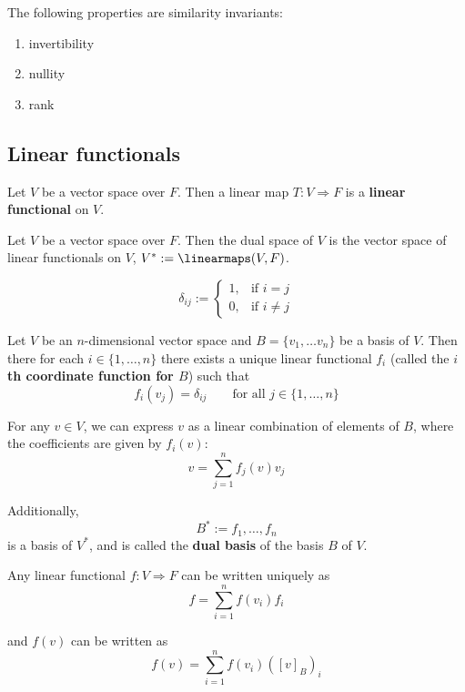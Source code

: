 \begin{theorem}
  The following properties are similarity invariants:
  \begin{enumerate}
    \item invertibility
    \item nullity
    \item rank
  \end{enumerate}
\end{theorem}

\subsection{Linear functionals}

\begin{definition}
  Let $V$ be a vector space over $F$. Then a linear map $T : V \Rightarrow F$ is a \textbf{linear functional} on $V$.
\end{definition}

\begin{definition}
  Let $V$ be a vector space over $F$. Then the dual space of $V$ is the vector space of linear functionals on $V$, $V^* := \linearmaps(V, F)$.
\end{definition}

\begin{definition}
  \[
    \delta_{ij} := \begin{cases}
      1, & \text{if $i = j$} \\
      0, & \text{if $i \neq j$}
    \end{cases}
  \]
\end{definition}

\begin{definition}
\end{definition}
\begin{definition}
\end{definition}
\begin{lemma}
  Let $V$ be an $n$-dimensional vector space and $B = \{v_1, \ldots v_n\}$ be a basis of $V$. Then there for each $i \in \{1, \ldots, n\}$ there exists a unique linear functional $f_i$ (called the \textbf{$i$th coordinate function for $B$}) such that
  \[
    f_i(v_j) = \delta_{ij} \qquad \text{for all $j \in \{1, \ldots, n\}$}
  \]

  For any $v \in V$, we can express $v$ as a linear combination of elements of $B$, where the coefficients are given by $f_i(v)$:
  \[
    v = \sum_{j = 1}^n f_j(v) v_j
  \]

  Additionally, 
  \[
    B^* := {f_1, \ldots, f_n}
  \]
  is a basis of $V^*$, and is called the \textbf{dual basis} of the basis $B$ of $V$.

  Any linear functional $f : V \Rightarrow F$ can be written uniquely as
  \[
    f = \sum_{i = 1}^n f(v_i) f_i
  \]

  and $f(v)$ can be written as
  \[
    f(v) = \sum_{i = 1}^n f(v_i) ([v]_B)_i
  \]
\end{lemma}

